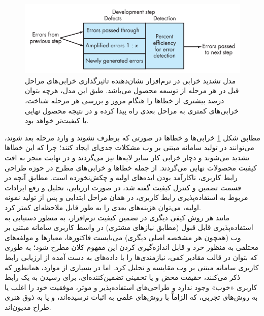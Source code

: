 \begin{figure}[H]
	\centering\includegraphics[width=12cm]{Resources/defect.PNG}
	\caption[مدل تشدید خرابی در نرم‌افزار]
	{مدل تشدید خرابی در نرم‌افزار
		\cite{pressman_software_2015}
		نشان‌دهنده تاثیرگذاری خرابی‌های مراحل قبل در هر مرحله از توسعه محصول می‌باشد. طبق این مدل، هرچه بتوان درصد بیشتری از خطاها را هنگام مرور و بررسی هر مرحله شناخت، خرابی‌های کمتری به مراحل بعدی راه پیدا کرده و در نتیجه محصول نهایی با کیفیت‌تر خواهد بود.
	}
	\label{fig:defect}
\end{figure}
مطابق شکل
\ref{fig:defect}
خرابی‌ها و خطاها در صورتی که برطرف نشوند و وارد مرحله بعد شوند، می‌توانند در تولید سامانه مبتنی بر وب مشکلات جدی‌ای ایجاد کنند؛ چرا که این خطاها تشدید می‌شوند و دچار خرابی کار سایر لایه‌ها نیز می‌گردند و در نهایت منجر به افت کیفیت محصولات نهایی می‌گردند. از جمله خطاها و خرابی‌های مطرح در حوزه طراحی رابط کاربری، ناکارآمد بودن ایده‌های اولیه و چکش‌نخورده است. مطابق آنچه در قسمت تضمین و کنترل کیفیت گفته شد، در صورت ارزیابی، تحلیل و رفع ایرادات مربوط به استفاده‌پذیری رابط کاربری، در همان مراحل ابتدایی و پس از تولید نمونه‌ اولیه، می‌توان هزینه‌های بعدی را به طور قابل ملاحظه‌ای کمتر کرد.\\
مانند هر روش کیفی دیگری در تضمین کیفیت نرم‌افزار، به منظور دستیابی به استفاده‌پذیری قابل قبول (مطابق نیازهای مشتری) در واسط کاربری سامانه مبتنی بر وب (همچون هر مشخصه اصلی دیگری) می‌بایست فاکتورها، معیارها و مولفه‌های مختلفی به منظور خرد و قابل اندازه‌گیری کردن این مفهوم کلان مطرح شود؛ به طوری که بتوان در قالب مقادیر کمی، نیازمندی‌ها را با داده‌های به دست آمده از ارزیابی رابط کاربری سامانه مبتنی بر وب مقایسه و تحلیل کرد. اما در بسیاری از موارد، همانطور که
\cite{agarwal_assessing_2002,p._miguel_review_2014, albert_measuring_2013}
ذکر می‌کنند، حقیقت محض و یا تخمینی تضمین‌کننده‌ای، برای رسیدن به یک رابط کاربری «خوب» وجود ندارد و طراحی‌های استفاده‌پذیر و موثر، موفقیت خود را اغلب یا به روش‌های تجربی، که الزاماً با روش‌های علمی به اثبات نرسیده‌اند، و یا به ذوق هنری طراح مدیون‌اند.

